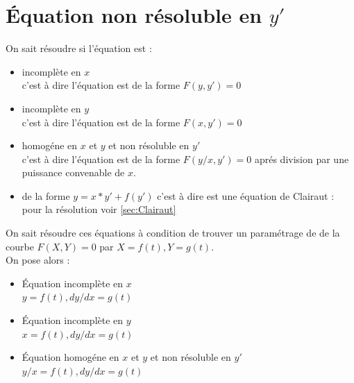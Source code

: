 \documentclass[a4paper,11pt]{book}
\begin{document}
\section{\'Equation  non r\'esoluble en $y'$}\label{sec:homog}
On sait r\'esoudre si l'\'equation est : 
\begin{itemize}
\item incompl\`ete en $x$\\
c'est \`a dire l'\'equation est de la forme $F(y,y')=0$
\item incompl\`ete en $y$\\
c'est \`a dire l'\'equation est de la forme $F(x,y')=0$
\item  homog\'ene en $x$ et $y$ et non r\'esoluble en $y'$\\
c'est \`a dire l'\'equation est de la forme $F(y/x,y')=0$ apr\'es division par 
une puissance convenable de $x$.
\item  de la forme $y=x*y'+f(y')$  c'est \`a dire est une \'equation de 
Clairaut : pour la r\'esolution voir \ref{sec:Clairaut}
\end{itemize}
On sait r\'esoudre ces \'equations \`a condition de trouver un param\'etrage de
de la courbe $F(X,Y)=0$ par $X=f(t),Y=g(t)$.\\
On pose alors :
\begin{itemize}
\item \'Equation incompl\`ete en $x$\\
 $y=f(t),dy/dx=g(t)$
\item \'Equation incompl\`ete en $y$\\
$x=f(t),dy/dx=g(t)$
\item  \'Equation homog\'ene en $x$ et $y$ et non r\'esoluble en $y'$\\
$y/x=f(t),dy/dx=g(t)$
\end{itemize}
\end{document}
